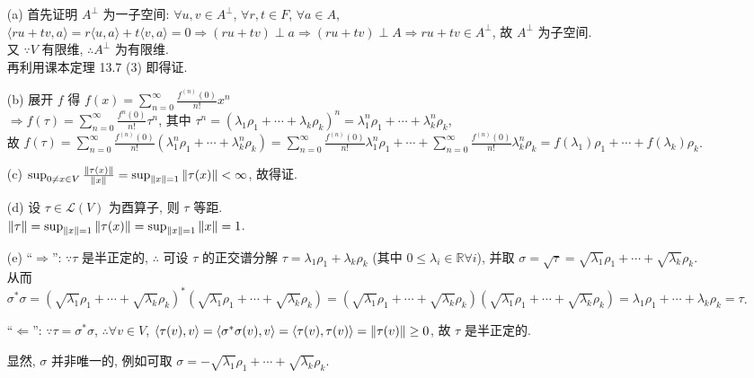 \documentclass{assignment}
\begin{document}
\begin{sol}
    \begin{itemize}
        \item[(a)] 首先证明 $A^{\perp}$ 为一子空间: $\forall u,v\in A^{\perp}$, $\forall r,t\in F$, $\forall a\in A$, $\langle ru+tv,a\rangle=r\langle u,a\rangle+t\langle v,a\rangle=0\Longrightarrow(ru+tv)\perp a\Longrightarrow(ru+tv)\perp A\Longrightarrow ru+tv\in A^{\perp}$, 故 $A^{\perp}$ 为子空间.\\
        又 $\because V$ 有限维, $\therefore A^{\perp}$ 为有限维.\\
        再利用课本定理 13.7 (3) 即得证.
        \item[(b)] 展开 $f$ 得 $f(x)=\sum_{n=0}^{\infty}\frac{f^{(n)}(0)}{n!}x^n$\\
        $\Longrightarrow f(\tau)=\sum_{n=0}^{\infty}\frac{f^{n}(0)}{n!}\tau^n$, 其中 $\tau^n=(\lambda_1\rho_1+\cdots+\lambda_k\rho_k)^n=\lambda_1^n\rho_1+\cdots+\lambda_k^n\rho_k$,\\
        故 $f(\tau)=\sum_{n=0}^{\infty}\frac{f^{(n)}(0)}{n!}(\lambda_1^n\rho_1+\cdots+\lambda_k^n\rho_k)=\sum_{n=0}^{\infty}\frac{f^{(n)}(0)}{n!}\lambda_1^n\rho_1+\cdots+\sum_{n=0}^{\infty}\frac{f^{(n)}(0)}{n!}\lambda_k^n\rho_k=f(\lambda_1)\rho_1+\cdots+f(\lambda_k)\rho_k$.
        \item[(c)] $\sup_{0\neq x\in V}\frac{\left\lVert\tau(x)\right\rVert}{\left\lVert x\right\rVert}=\sup_{\left\lVert x\right\rVert=1}\left\lVert\tau(x)\right\rVert<\infty$, 故得证.
        \item[(d)] 设 $\tau\in\mathcal{L}(V)$ 为酉算子, 则 $\tau$ 等距.\\
        $\left\lVert\tau\right\rVert=\sup_{\left\lVert x\right\rVert=1}\left\lVert\tau(x)\right\rVert=\sup_{\left\lVert x\right\rVert=1}\left\lVert x\right\rVert=1$.
        \item[(e)] ``$\Longrightarrow$'': $\because\tau$ 是半正定的, $\therefore$ 可设 $\tau$ 的正交谱分解 $\tau=\lambda_1\rho_1+\lambda_k\rho_k$ (其中 $0\leq\lambda_i\in\mathbb{R}\forall i$), 并取 $\sigma=\sqrt{\tau}=\sqrt{\lambda_1}\rho_1+\cdots+\sqrt{\lambda_k}\rho_k$.\\
        从而 $\sigma^*\sigma=(\sqrt{\lambda_1}\rho_1+\cdots+\sqrt{\lambda_k}\rho_k)^*(\sqrt{\lambda_1}\rho_1+\cdots+\sqrt{\lambda_k}\rho_k)=(\sqrt{\lambda_1}\rho_1+\cdots+\sqrt{\lambda_k}\rho_k)(\sqrt{\lambda_1}\rho_1+\cdots+\sqrt{\lambda_k}\rho_k)=\lambda_1\rho_1+\cdots+\lambda_k\rho_k=\tau$.

        ``$\Longleftarrow$'': $\because\tau=\sigma^*\sigma$, $\therefore\forall v\in V$, $\langle\tau(v),v\rangle=\langle\sigma^*\sigma(v),v\rangle=\langle\tau(v),\tau(v)\rangle=\left\lVert\tau(v)\right\rVert\geq 0$, 故 $\tau$ 是半正定的.

        显然, $\sigma$ 并非唯一的, 例如可取 $\sigma=-\sqrt{\lambda_1}\rho_1+\cdots+\sqrt{\lambda_k}\rho_k$.
    \end{itemize}
\end{sol}
\end{document}
